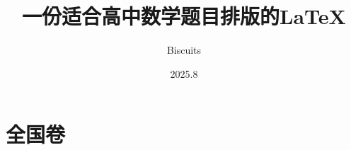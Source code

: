 \documentclass[
noshowanswers,             %
answercolor=red,      %
numbercolor=purple,      %
paper=a3,
juemi,
zhuyishixiang,
 noexample  
]{biscuits}
\begin{document}
\title{ 一份适合高中数学题目排版的\LaTeX}
\author{Biscuits}
\date{2025.8}
\maketitle

\tableofcontents

\newpage
\chapter{全国卷}
	



	


%
%
%
%
\end{document}

